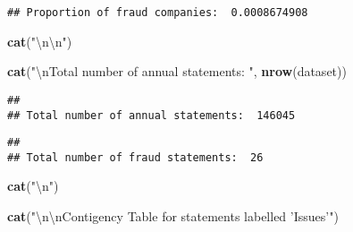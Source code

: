 \documentclass[
]{article}
\newenvironment{Shaded}{\begin{snugshade}}{\end{snugshade}}
\newcommand{\CharTok}[1]{\textcolor[rgb]{0.31,0.60,0.02}{#1}}
\newcommand{\DecValTok}[1]{\textcolor[rgb]{0.00,0.00,0.81}{#1}}
\newcommand{\KeywordTok}[1]{\textcolor[rgb]{0.13,0.29,0.53}{\textbf{#1}}}
\newcommand{\NormalTok}[1]{#1}
\newcommand{\OperatorTok}[1]{\textcolor[rgb]{0.81,0.36,0.00}{\textbf{#1}}}
\newcommand{\StringTok}[1]{\textcolor[rgb]{0.31,0.60,0.02}{#1}}
\begin{document}
\begin{verbatim}
## Proportion of fraud companies:  0.0008674908
\end{verbatim}

\begin{Shaded}
\begin{Highlighting}[]
        \KeywordTok{cat}\NormalTok{(}\StringTok{"}\CharTok{\textbackslash{}n\textbackslash{}n}\StringTok{"}\NormalTok{)}
\end{Highlighting}
\end{Shaded}

\begin{Shaded}
\begin{Highlighting}[]
        \KeywordTok{cat}\NormalTok{(}\StringTok{"}\CharTok{\textbackslash{}n}\StringTok{Total number of annual statements: "}\NormalTok{, }\KeywordTok{nrow}\NormalTok{(dataset))}
\end{Highlighting}
\end{Shaded}

\begin{verbatim}
## 
## Total number of annual statements:  146045
\end{verbatim}

\begin{Shaded}
\end{Shaded}

\begin{verbatim}
## 
## Total number of fraud statements:  26
\end{verbatim}

\begin{Shaded}
\begin{Highlighting}[]
        \KeywordTok{cat}\NormalTok{(}\StringTok{"}\CharTok{\textbackslash{}n}\StringTok{"}\NormalTok{)}
\end{Highlighting}
\end{Shaded}

\begin{Shaded}
\begin{Highlighting}[]
        \KeywordTok{cat}\NormalTok{(}\StringTok{"}\CharTok{\textbackslash{}n\textbackslash{}n}\StringTok{Contigency Table for statements labelled 'Issues'"}\NormalTok{)}
\end{Highlighting}
\end{Shaded}
\end{document}
